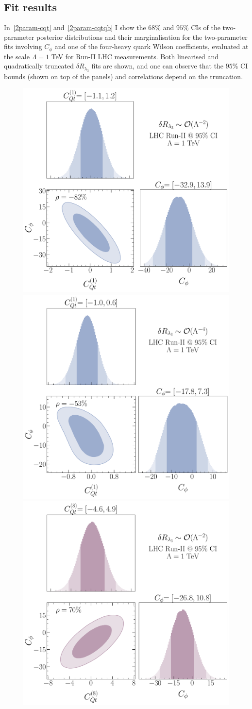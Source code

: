 	\subsection{Fit results}
	\par 
	In~\autoref{2param-cqt} and~\autoref{2param-cqtqb} I show the $68\%$ and $ 95\%$  CIs of the two-parameter posterior distributions and their marginalisation for the two-parameter fits involving $C_\phi$ and one of the four-heavy quark Wilson coefficients, evaluated at the scale $\Lambda=1$ TeV for Run-II LHC measurements.  
	Both linearised and quadratically truncated $\delta R_{\lambda_3}$ fits are shown, and one can observe that the $95\%$ CI bounds (shown on top of the panels) and correlations depend on the truncation.
	\begin{figure}[h!]
		\begin{center}
			\includegraphics[width=0.45\linewidth]{fig/Cqt1_LHC_RunII_linearl3_rge}
			\includegraphics[width=0.45\linewidth]{fig/Cqt1_LHC_RunII_quadl3_rge} \\ 
			\includegraphics[width=0.45\linewidth]{fig/Cqt8_LHC_RunII_linearl3_rge}

\end{center}
\end{figure}
